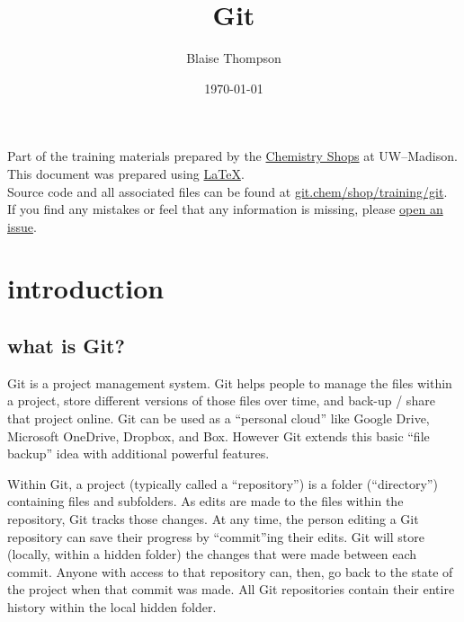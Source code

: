 \documentclass{training}
\title{Git}
\date{\today}
\author{Blaise Thompson}
\begin{document}
\maketitle
\renewcommand{\baselinestretch}{0.5}\normalsize
\tableofcontents
\renewcommand{\baselinestretch}{1.0}\normalsize
\vfill

Part of the training materials prepared by the \href{https://shops.chem.wisc.edu/}{Chemistry Shops} at UW--Madison. \\
This document was prepared using \href{https://www.latex-project.org/}{\LaTeX}. \\
Source code and all associated files can be found at \href{https://git.chem.wisc.edu/shop/training/git}{git.chem/shop/training/git}. \\
If you find any mistakes or feel that any information is missing, please \href{https://git.chem.wisc.edu/shop/training/git/issues}{open an issue}. \\

\clearpage
\section{introduction}

\subsection{what is Git?}

Git is a project management system.
Git helps people to manage the files within a project, store different versions of those files over time, and back-up / share that project online.
Git can be used as a ``personal cloud'' like Google Drive, Microsoft OneDrive, Dropbox, and Box.
However Git extends this basic ``file backup'' idea with additional powerful features.

Within Git, a project (typically called a ``repository'') is a folder (``directory'') containing files and subfolders.
As edits are made to the files within the repository, Git tracks those changes.
At any time, the person editing a Git repository can save their progress by ``commit''ing their edits.
Git will store (locally, within a hidden folder) the changes that were made between each commit.
Anyone with access to that repository can, then, go back to the state of the project when that commit was made.
All Git repositories contain their entire history within the local hidden folder.
\end{document}
